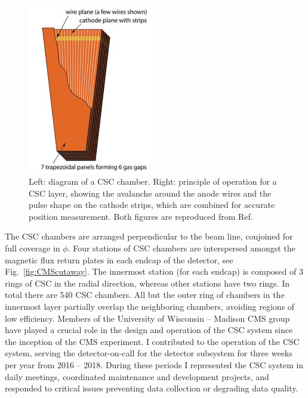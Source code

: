 \begin{figure}[htbp]
  \centering
   \includegraphics[width=0.49\textwidth]{figures/LHCandCMS/CSCdiagram.png}
  \caption[Layout and illustration of operation of a CSC chamber]{
    Left: diagram of a CSC chamber. Right: principle of operation for a CSC
    layer, showing the avalanche around the anode wires and the pulse shape
    on the cathode strips, which are combined for accurate position measurement.
    Both figures are reproduced from Ref.~\cite{Chatrchyan:2008aa}
        }
 \label{fig:CSC}
\end{figure}

The CSC chambers are arranged perpendicular to the beam line,
conjoined for full coverage in $\phi$. Four stations of CSC chambers are interspersed
amongst the magnetic flux return plates in each endcap of the detector, see
Fig.~\ref{fig:CMScutaway}. The innermost station (for each endcap) is composed of 
3 rings of CSC in the radial direction, whereas other stations have two rings.
In total there are 540 CSC chambers. All but the outer ring of chambers in the 
innermost layer partially overlap the neighboring chambers, avoiding regions
of low efficiency. Members of the University of Wisconsin -- Madison 
CMS group have played a crucial role in the design and operation of the CSC
system since the inception of the CMS experiment. I contributed to the operation
of the CSC system, serving the detector-on-call for the
detector subsystem for three weeks per year from 2016 -- 2018. During these periods
I represented the CSC system in daily meetings, coordinated maintenance and 
development projects, and responded to critical issues preventing data collection
or degrading data quality.

